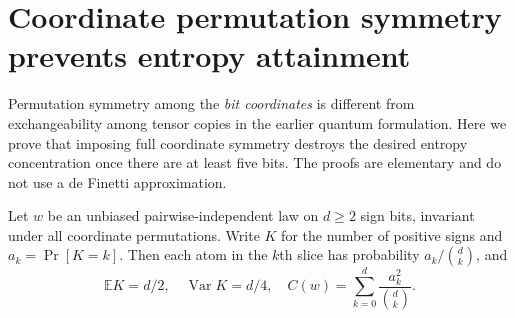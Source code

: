 \section{Coordinate permutation symmetry prevents entropy attainment}
\label{s12:sec:coordinate-symmetry}
Permutation symmetry among the \emph{bit coordinates} is different
from exchangeability among tensor copies in the earlier quantum
formulation. Here we prove that imposing full coordinate symmetry
destroys the desired entropy concentration once there are at least
five bits. The proofs are elementary and do not use a de Finetti approximation.

Let $w$ be an unbiased pairwise-independent law on $d\ge2$ sign bits,
invariant under all coordinate permutations. Write $K$ for the number
of positive signs and $a_k=\Pr[K=k]$. Then each atom in the $k$th
slice has probability $a_k/\binom dk$, and
\[
 \mathbb E K=d/2,\quad \operatorname{Var}K=d/4,\quad
 C(w)=\sum_{k=0}^d\frac{a_k^2}{\binom dk}.
\]

